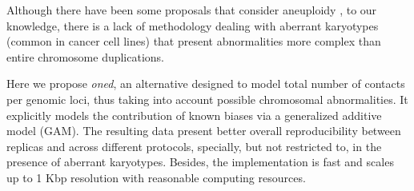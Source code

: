 \documentclass{bioinfo}
\begin{document}
Although there have been some proposals that consider aneuploidy
\citep{wu2016computational}, to our knowledge, there is a lack of
methodology dealing with aberrant karyotypes (common in cancer cell lines)
that present abnormalities more complex than entire chromosome
duplications.

Here we propose \textit{oned}, an alternative designed to model total
number of contacts per genomic loci, thus taking into account possible
chromosomal abnormalities. It explicitly models the contribution of known
biases via a generalized additive model (GAM). The resulting data present
better overall reproducibility between replicas and across different
protocols, specially, but not restricted to, in the presence of aberrant
karyotypes. Besides, the implementation is fast and scales up to 1 Kbp
resolution with reasonable computing resources.

\end{document}
